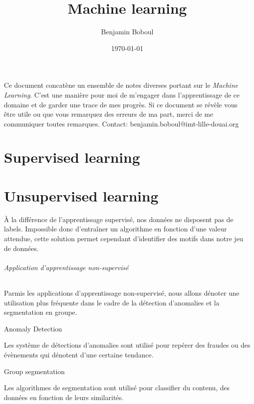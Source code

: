 \documentclass[../../cs-notes.tex]{subfiles}
\title{Machine learning}
\author{Benjamin Boboul}
\date{\today}
\begin{document}
	\maketitle

	Ce document concat\`ene un ensemble de notes diverses portant sur le \textit{Machine Learning}.
	C'est une manière pour moi de m'engager dans l'apprentissage de ce domaine et de garder une trace de mes progrès.
	Si ce document se r\'ev\`ele vous être utile ou que vous remarquez des erreurs de ma part, merci de me communiquer toutes remarques.
	Contact: benjamin.boboul@imt-lille-douai.org

	\part{Supervised learning}

	
	
	
	
	
	
	
	
	
	

	\part{Unsupervised learning}

	À la différence de l'apprentissage supervisé, nos données ne disposent pas de labels.
	Impossible donc d'entraîner un algorithme en fonction d'une valeur attendue, cette solution permet cependant d'identifier des motifs dans notre jeu de données.

	\paragraph{Application d'apprentissage non-supervisé}
	Parmis les applications d'apprentissage non-supervisé, nous allons dénoter une utilisation plus fréquente dans le cadre de la détection d'anomalies et la segmentation en groupe.

	\subparagraph{Anomaly Detection} Les système de détections d'anomalies sont utilisé pour repérer des fraudes ou des évènements qui dénotent d'une certaine tendance.

	\subparagraph{Group segmentation}
	Les algorithmes de segmentation sont utilisé pour classifier du contenu, des données en fonction de leurs similarités.
\end{document}
